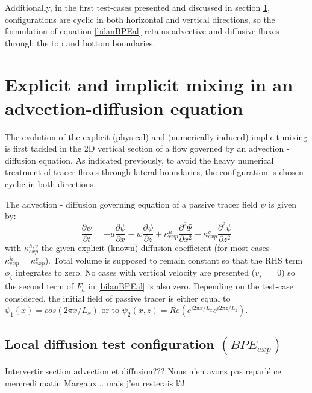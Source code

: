 Additionally, in the first test-cases presented and discussed in section \ref{section_numlab}, configurations are cyclic in both horizontal and vertical directions, so the formulation of equation \ref{bilanBPEal} retains advective and diffusive fluxes through the top and bottom boundaries.


\section{Explicit and implicit mixing in an advection-diffusion equation}
\label{section_numlab}
The evolution of the explicit (physical) and (numerically induced) implicit mixing is first tackled in the 2D vertical section of a flow governed by an advection - diffusion equation. As indicated previously, to avoid the heavy numerical treatment of tracer fluxes through lateral boundaries, the configuration is chosen cyclic in both directions.

The advection - diffusion governing equation of a passive tracer field $\psi$ is given by:
\begin{equation}
\frac{\partial \psi}{\partial t} = -u\frac{\partial \psi}{\partial x} - w\frac{\partial \psi}{\partial z} + \kappa_{exp}^h \frac{\partial^2 \Psi}{\partial x^2} + \kappa_{exp}^v \frac{\partial^2 \psi}{\partial z^2}
\label{eqAdvDiff}
\end{equation}
with $\kappa_{exp}^{h,v}$ the given explicit (known) diffusion coefficient (for most cases $\kappa_{exp}^{h}=\kappa_{exp}^{v}$).
Total volume is supposed to remain constant so that the RHS term $\phi_{\zeta}$ integrates to zero. No cases with vertical velocity are presented ($v_s\ =\ 0$) so the second term of $F_a$ in \ref{bilanBPEal} is also zero.
Depending on the test-case considered, the initial field of passive tracer is either equal to $\psi_1(x)=cos(2\pi x/L_x)$ or to $\psi_2(x,z)=Re(e^{i2\pi x/L_x}e^{i 2 \pi z/L_z})$.

\subsection{Local diffusion test configuration $(BPE_{exp})$}
\color{red} Intervertir section advection et diffusion??? Nous n'en avons pas reparlé ce mercredi matin Margaux... mais j'en resterais là!\color{black}

